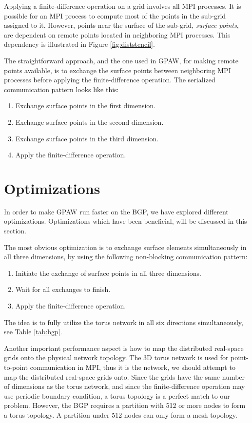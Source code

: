 \documentclass[preprint,3p,times,twocolumn]{elsarticle}
\begin{document}
Applying a finite-difference operation on a grid involves all MPI processes. It is possible for an MPI process to compute most of the points in the sub-grid assigned to it. However, points near the surface of the sub-grid, \emph{surface points}, are dependent on remote points located in neighboring MPI processes. This dependency is illustrated in Figure \ref{fig:diststencil}.

The straightforward approach, and the one used in GPAW, for making remote points available, is to exchange the surface points between neighboring MPI processes before applying the finite-difference operation. The serialized communication pattern looks like this:
\begin{enumerate}
 \item Exchange surface points in the first dimension.
 \item Exchange surface points in the second dimension.
 \item Exchange surface points in the third dimension.
 \item Apply the finite-difference operation.
\end{enumerate}

\section{Optimizations}\label{section:opt}
In order to make GPAW run faster on the BGP, we have explored different optimizations. Optimizations which have been beneficial, will be discussed in this section.

The most obvious optimization is to exchange surface elements simultaneously in all three dimensions, by using the following non-blocking communication pattern:
\begin{enumerate}
 \item Initiate the exchange of surface points in all three dimensions.
 \item Wait for all exchanges to finish.
 \item Apply the finite-difference operation.
\end{enumerate}
The idea is to fully utilize the torus network in all six directions simultaneously, see Table \ref{tab:bgp}.

Another important performance aspect is how to map the distributed real-space grids onto the physical network topology. The 3D torus network is used for point-to-point communication in MPI, thus it is the network, we should attempt to map the distributed real-space grids onto. Since the grids have the same number of dimensions as the torus network, and since the finite-difference operation may use periodic boundary condition, a torus topology is a perfect match to our problem. However, the BGP requires a partition with 512 or more nodes to form a torus topology. A partition under 512 nodes can only form a mesh topology.
\end{document}
